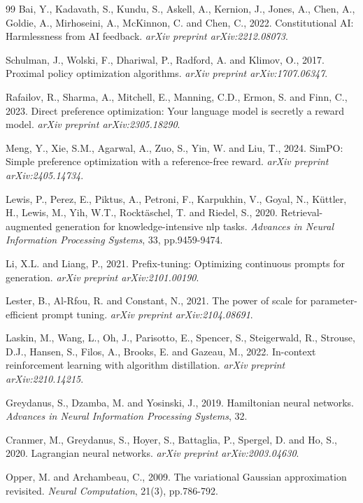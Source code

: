 \begin{thebibliography}{99}
Bai, Y., Kadavath, S., Kundu, S., Askell, A., Kernion, J., Jones, A., Chen, A., Goldie, A., Mirhoseini, A., McKinnon, C. and Chen, C., 2022. Constitutional AI: Harmlessness from AI feedback. \textit{arXiv preprint arXiv:2212.08073}.

Schulman, J., Wolski, F., Dhariwal, P., Radford, A. and Klimov, O., 2017. Proximal policy optimization algorithms. \textit{arXiv preprint arXiv:1707.06347}.

Rafailov, R., Sharma, A., Mitchell, E., Manning, C.D., Ermon, S. and Finn, C., 2023. Direct preference optimization: Your language model is secretly a reward model. \textit{arXiv preprint arXiv:2305.18290}.

Meng, Y., Xie, S.M., Agarwal, A., Zuo, S., Yin, W. and Liu, T., 2024. SimPO: Simple preference optimization with a reference-free reward. \textit{arXiv preprint arXiv:2405.14734}.

Lewis, P., Perez, E., Piktus, A., Petroni, F., Karpukhin, V., Goyal, N., Küttler, H., Lewis, M., Yih, W.T., Rocktäschel, T. and Riedel, S., 2020. Retrieval-augmented generation for knowledge-intensive nlp tasks. \textit{Advances in Neural Information Processing Systems}, 33, pp.9459-9474.

Li, X.L. and Liang, P., 2021. Prefix-tuning: Optimizing continuous prompts for generation. \textit{arXiv preprint arXiv:2101.00190}.

Lester, B., Al-Rfou, R. and Constant, N., 2021. The power of scale for parameter-efficient prompt tuning. \textit{arXiv preprint arXiv:2104.08691}.

Laskin, M., Wang, L., Oh, J., Parisotto, E., Spencer, S., Steigerwald, R., Strouse, D.J., Hansen, S., Filos, A., Brooks, E. and Gazeau, M., 2022. In-context reinforcement learning with algorithm distillation. \textit{arXiv preprint arXiv:2210.14215}.

Greydanus, S., Dzamba, M. and Yosinski, J., 2019. Hamiltonian neural networks. \textit{Advances in Neural Information Processing Systems}, 32.

Cranmer, M., Greydanus, S., Hoyer, S., Battaglia, P., Spergel, D. and Ho, S., 2020. Lagrangian neural networks. \textit{arXiv preprint arXiv:2003.04630}.

Opper, M. and Archambeau, C., 2009. The variational Gaussian approximation revisited. \textit{Neural Computation}, 21(3), pp.786-792.


\end{thebibliography}
